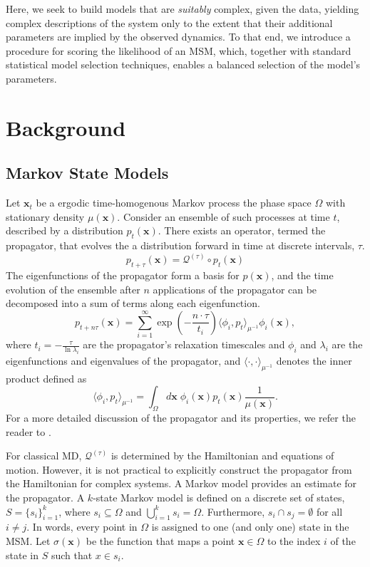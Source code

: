 \documentclass[journal=jpcbfk, layout=traditional, manuscript=article]{achemso}
\begin{document}
Here, we seek to build models that are \emph{suitably} complex, given the data, yielding complex descriptions of the system only to the extent that their additional parameters are implied by the observed dynamics. To that end, we introduce a procedure for scoring the likelihood of an MSM, which, together with standard statistical model selection techniques, enables a balanced selection of the model's parameters. 

\section{Background}
\subsection{Markov State Models}
Let $\mathbf{x}_t$ be a ergodic time-homogenous Markov process the phase space $\Omega$ with stationary density $\mu(\mathbf{x})$. Consider an ensemble of such processes at time $t$, described by a distribution $p_t(\mathbf{x})$. There exists an operator, termed the propagator, that evolves the a distribution forward in time at discrete intervals, $\tau$.
\begin{equation}
p_{t+\tau}(\mathbf{x}) = \mathcal{Q}^{(\tau)} \circ p_{t}(\mathbf{x})
\end{equation}
The eigenfunctions of the propagator form a basis for $p(\mathbf{x})$, and the time evolution of the ensemble after $n$ applications of the propagator can be decomposed into a sum of terms along each eigenfunction.
\begin{equation}
\label{eq:prop-timescales}
p_{t+n\tau}(\mathbf{x}) = \sum_{i=1}^\infty \exp\left(-\frac{n \cdot \tau}{t_i}\right) \langle \phi_i, p_t \rangle_{\mu^{-1}} \phi_i(\mathbf{x}),
\end{equation}
where $t_i = -\displaystyle\frac{\tau}{\ln \lambda_i}$ are the propagator's relaxation timescales and $\phi_i$ and $\lambda_i$ are the eigenfunctions and eigenvalues of the propagator, and $\langle \cdot, \cdot \rangle_{\mu^{-1}}$ denotes the inner product defined as
\begin{equation}
\langle \phi_i, p_t \rangle_{\mu^{-1}} = \int_\Omega d\mathbf{x}\; \phi_i(\mathbf{x}) p_t(\mathbf{x}) \frac{1}{\mu(\mathbf{x})}.
\end{equation}
For a more detailed discussion of the propagator and its properties, we refer the reader to \citet{Prinz2011Markov}.

For classical MD, $\mathcal{Q}^{(\tau)}$ is determined by the Hamiltonian and equations of motion\cite{Schutte2001Transfer}. However, it is not practical to explicitly construct the propagator from the Hamiltonian for complex systems. A Markov model provides an estimate for the propagator. A $k$-state Markov model is defined on a discrete set of states, $S = \{s_i\}_{i=1}^k$, where $s_i \subseteq \Omega$ and $\bigcup_{i=1}^k s_i = \Omega$. Furthermore, $s_i \cap s_j = \emptyset$ for all $i \neq j$. In words, every point in $\Omega$ is assigned to one (and only one) state in the MSM. Let $\sigma(\mathbf{x})$ be the function that maps a point $\mathbf{x} \in \Omega$ to the index $i$ of the state in $S$ such that $x \in s_i$.
\end{document}

